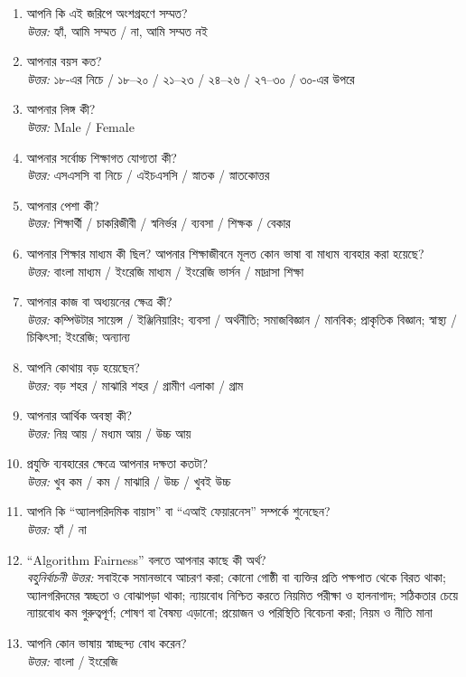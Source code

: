 \documentclass[11pt]{article}
\newcommand{\bn}[1]{{\bengalifont\upshape #1}}
\begin{document}
\begin{enumerate}
\item \bn{আপনি কি এই জরিপে অংশগ্রহণে সম্মত?}\\
\emph{\bn{উত্তর:}} \bn{হ্যাঁ, আমি সম্মত / না, আমি সম্মত নই}
\item \bn{আপনার বয়স কত?}\\
\emph{\bn{উত্তর:}} \bn{১৮-এর নিচে / ১৮--২০ / ২১--২৩ / ২৪--২৬ / ২৭--৩০ / ৩০-এর উপরে}
\item \bn{আপনার লিঙ্গ কী?}\\
\emph{\bn{উত্তর:}} Male / Female
\item \bn{আপনার সর্বোচ্চ শিক্ষাগত যোগ্যতা কী?}\\
\emph{\bn{উত্তর:}} \bn{এসএসসি বা নিচে / এইচএসসি / স্নাতক / স্নাতকোত্তর}
\item \bn{আপনার পেশা কী?}\\
\emph{\bn{উত্তর:}} \bn{শিক্ষার্থী / চাকরিজীবী / স্বনির্ভর / ব্যবসা / শিক্ষক / বেকার}
\item \bn{আপনার শিক্ষার মাধ্যম কী ছিল? আপনার শিক্ষাজীবনে মূলত কোন ভাষা বা মাধ্যম ব্যবহার করা হয়েছে?}\\
\emph{\bn{উত্তর:}} \bn{বাংলা মাধ্যম / ইংরেজি মাধ্যম / ইংরেজি ভার্সন / মাদ্রাসা শিক্ষা}
\item \bn{আপনার কাজ বা অধ্যয়নের ক্ষেত্র কী?}\\
\emph{\bn{উত্তর:}} \bn{কম্পিউটার সায়েন্স / ইঞ্জিনিয়ারিং; ব্যবসা / অর্থনীতি; সমাজবিজ্ঞান / মানবিক; প্রাকৃতিক বিজ্ঞান; স্বাস্থ্য / চিকিৎসা; ইংরেজি; অন্যান্য}
\item \bn{আপনি কোথায় বড় হয়েছেন?}\\
\emph{\bn{উত্তর:}} \bn{বড় শহর / মাঝারি শহর / গ্রামীণ এলাকা / গ্রাম}
\item \bn{আপনার আর্থিক অবস্থা কী?}\\
\emph{\bn{উত্তর:}} \bn{নিম্ন আয় / মধ্যম আয় / উচ্চ আয়}
\item \bn{প্রযুক্তি ব্যবহারের ক্ষেত্রে আপনার দক্ষতা কতটা?}\\
\emph{\bn{উত্তর:}} \bn{খুব কম / কম / মাঝারি / উচ্চ / খুবই উচ্চ}
\item \bn{আপনি কি ``অ্যালগরিদমিক বায়াস'' বা ``এআই ফেয়ারনেস'' সম্পর্কে শুনেছেন?}\\
\emph{\bn{উত্তর:}} \bn{হ্যাঁ / না}
\item \bn{``Algorithm Fairness'' বলতে আপনার কাছে কী অর্থ?}\\
\emph{\bn{বহুনির্বাচনী উত্তর:}} \bn{সবাইকে সমানভাবে আচরণ করা; কোনো গোষ্ঠী বা ব্যক্তির প্রতি পক্ষপাত থেকে বিরত থাকা; অ্যালগরিদমের স্বচ্ছতা ও বোঝাপড়া থাকা; ন্যায়বোধ নিশ্চিত করতে নিয়মিত পরীক্ষা ও হালনাগাদ; সঠিকতার চেয়ে ন্যায়বোধ কম গুরুত্বপূর্ণ; শোষণ বা বৈষম্য এড়ানো; প্রয়োজন ও পরিস্থিতি বিবেচনা করা; নিয়ম ও নীতি মানা}
\item \bn{আপনি কোন ভাষায় স্বাচ্ছন্দ্য বোধ করেন?}\\
\emph{\bn{উত্তর:}} \bn{বাংলা / ইংরেজি}
\end{enumerate}
\end{document}

